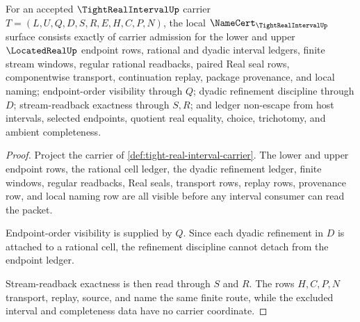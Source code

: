 \begin{theorem}
\label{thm:tight-real-interval-namecert-obligations}
For an accepted $\TightRealIntervalUp$ carrier $T=(L,U,Q,D,S,R,E,H,C,P,N)$, the local $\NameCert_{\TightRealIntervalUp}$ surface consists exactly of carrier admission for the lower and upper $\LocatedRealUp$ endpoint rows, rational and dyadic interval ledgers, finite stream windows, regular rational readbacks, paired Real seal rows, componentwise transport, continuation replay, package provenance, and local naming; endpoint-order visibility through $Q$; dyadic refinement discipline through $D$; stream-readback exactness through $S,R$; and ledger non-escape from host intervals, selected endpoints, quotient real equality, choice, trichotomy, and ambient completeness.
\end{theorem}
\begin{proof}
Project the carrier of \autoref{def:tight-real-interval-carrier}. The lower and upper endpoint rows, the rational cell ledger, the dyadic refinement ledger, finite windows, regular readbacks, Real seals, transport rows, replay rows, provenance row, and local naming row are all visible before any interval consumer can read the packet.

Endpoint-order visibility is supplied by $Q$. Since each dyadic refinement in $D$ is attached to a rational cell, the refinement discipline cannot detach from the endpoint ledger.

Stream-readback exactness is then read through $S$ and $R$. The rows $H,C,P,N$ transport, replay, source, and name the same finite route, while the excluded interval and completeness data have no carrier coordinate.
\end{proof}

